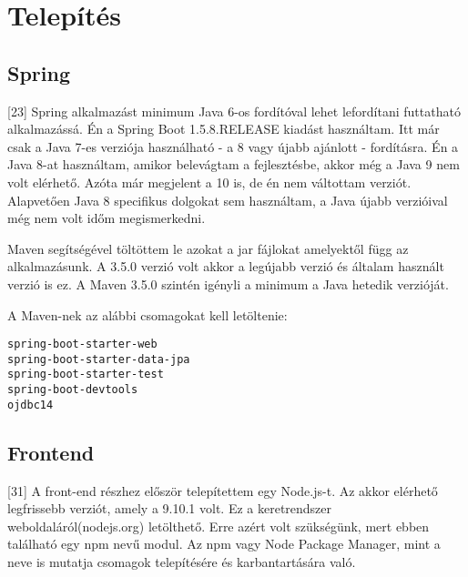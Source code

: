 



\section{Telepítés}
\subsection{Spring}

[23] Spring alkalmazást minimum Java 6-os fordítóval lehet lefordítani futtatható alkalmazássá. Én a Spring Boot 1.5.8.RELEASE kiadást használtam. Itt már csak a Java 7-es verziója használható - a 8 vagy újabb ajánlott - fordításra. Én a Java 8-at használtam, amikor belevágtam a fejlesztésbe, akkor még a Java 9 nem volt elérhető. Azóta már megjelent a 10 is, de én nem váltottam verziót. Alapvetően Java 8 specifikus dolgokat sem használtam, a Java újabb verzióival még nem volt időm megismerkedni.

Maven segítségével töltöttem le azokat a jar fájlokat amelyektől függ az alkalmazásunk. A 3.5.0 verzió volt akkor a legújabb verzió és általam használt verzió is ez. A Maven 3.5.0 szintén igényli a minimum a Java hetedik verzióját.

A Maven-nek az alábbi csomagokat kell letöltenie:
\begin{verbatim}
spring-boot-starter-web
spring-boot-starter-data-jpa
spring-boot-starter-test
spring-boot-devtools
ojdbc14
\end{verbatim}


\subsection{Frontend}

[31] A front-end részhez először telepítettem egy Node.js-t. Az akkor elérhető legfrissebb verziót, amely a 9.10.1 volt. Ez a keretrendszer weboldaláról(nodejs.org) letölthető. Erre azért volt szükségünk, mert ebben található egy npm nevű modul. Az npm vagy Node Package Manager, mint a neve is mutatja csomagok telepítésére és karbantartására való.

